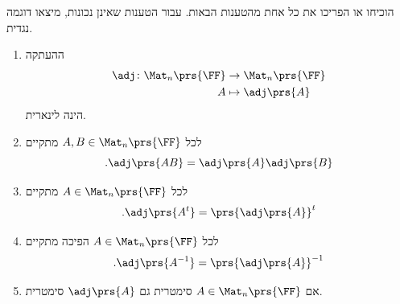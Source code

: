 \documentclass[a4paper,10pt,twoside,openany]{article}
\begin{document}
\begin{exercise}
הוכיחו או הפריכו את כל אחת מהטענות הבאות. עבור הטענות שאינן נכונות, מיצאו דוגמה נגדית.

\begin{enumerate}
\item ההעתקה
\begin{align*}
\adj \colon \Mat_n\prs{\FF} &\to \Mat_n\prs{\FF} \\
A &\mapsto \adj\prs{A}
\end{align*}
הינה לינארית.

\item לכל
$A,B \in \Mat_n\prs{\FF}$
מתקיים
\[\text{.} \adj\prs{AB} = \adj\prs{A} \adj\prs{B}\]

\item לכל
$A \in \Mat_n\prs{\FF}$
מתקיים
\[\text{.} \adj\prs{A^t} = \prs{\adj\prs{A}}^t\]

\item לכל
$A \in \Mat_n\prs{\FF}$
הפיכה מתקיים
\[\text{.} \adj\prs{A^{-1}} = \prs{\adj\prs{A}}^{-1}\]

\item אם
$A \in \Mat_n\prs{\FF}$
סימטרית גם
$\adj\prs{A}$
סימטרית.
\end{enumerate}
\end{exercise}
\end{document}
